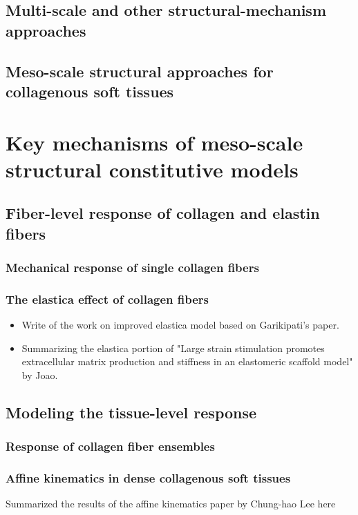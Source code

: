 \subsection{Multi-scale and other structural-mechanism approaches}
\subsection{Meso-scale structural approaches for collagenous soft tissues}

\section{Key mechanisms of meso-scale structural constitutive models}
\subsection{Fiber-level response of collagen and elastin fibers}
\subsubsection{Mechanical response of single collagen fibers}
\subsubsection{The elastica effect of collagen fibers}
\begin{itemize}
\item Write of the work on improved elastica model based on Garikipati's paper.
\item Summarizing the elastica portion of "Large strain stimulation promotes extracellular matrix production and stiffness in an elastomeric scaffold model" by Joao. 
\end{itemize}

\subsection{Modeling the tissue-level response}
\subsubsection{Response of collagen fiber ensembles}
\subsubsection{Affine kinematics in dense collagenous soft tissues}
Summarized the results of the affine kinematics paper by Chung-hao Lee here



